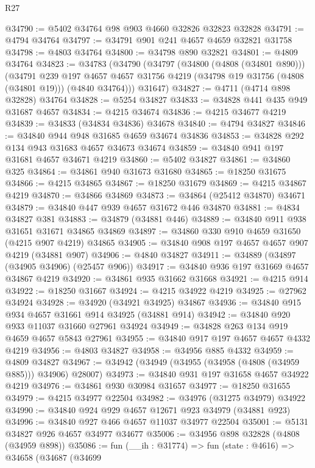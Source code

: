 \begin{lexlean}{R27}
\begin{coremodule}
@34790 := @5402 @34764 @98 @903 @4660 @32826 @32823 @32828
@34791 := @4794 @34764
@34797 := @34791 @901 @241 @4657 @4659 @32821 @31758
@34798 := @4803 @34764
@34800 := @34798 @890 @32821
@34801 := @4809 @34764
@34823 := @34783
    (@34790
      (@34797
        (@34800 (@4808 (@34801 @890)))
        (@34791
          @239
          @197
          @4657
          @4657
          @31756
          @4219
          (@34798 @19 @31756 (@4808 (@34801 @19)))
          (@4840 @34764)))
      @31647)
@34827 := @4711 (@4714 @898 @32828) @34764
@34828 := @5254 @34827
@34833 := @34828 @441 @435 @949 @31687 @4657
@34834 := @4215 @34674
@34836 := @4215 @34677 @4219
@34839 := @34833 (@34834 @34836) @34678
@34840 := @4794 @34827
@34846 := @34840 @944 @948 @31685 @4659 @34674 @34836
@34853 := @34828 @292 @134 @943 @31683 @4657 @34673 @34674
@34859 := @34840 @941 @197 @31681 @4657 @34671 @4219
@34860 := @5402 @34827
@34861 := @34860 @325
@34864 := @34861 @940 @31673 @31680
@34865 := @18250 @31675
@34866 := @4215 @34865
@34867 := @18250 @31679
@34869 := @4215 @34867 @4219
@34870 := @34866 @34869
@34873 := @34864 (@25412 @34870) @34671
@34879 := @34840 @447 @939 @4657 @31672 @446 @34870
@34881 := @4834 @34827 @381
@34883 := @34879 (@34881 @446)
@34889 := @34840 @911 @938 @31651 @31671 @34865 @34869
@34897 := @34860 @330 @910 @4659 @31650 (@4215 @907 @4219) @34865
@34905 := @34840 @908 @197 @4657 @4657 @907 @4219 (@34881 @907)
@34906 := @4840 @34827
@34911 := @34889 (@34897 (@34905 @34906) (@25457 @906))
@34917 := @34840 @936 @197 @31669 @4657 @34867 @4219
@34920 := @34861 @935 @31662 @31668
@34921 := @4215 @914
@34922 := @18250 @31667
@34924 := @4215 @34922 @4219
@34925 := @27962 @34924
@34928 := @34920 (@34921 @34925) @34867
@34936 := @34840 @915 @934 @4657 @31661 @914 @34925 (@34881 @914)
@34942 := @34840 @920 @933 @11037 @31660 @27961 @34924
@34949 := @34828 @263 @134 @919 @4659 @4657 @5843 @27961
@34955 := @34840 @917 @197 @4657 @4657 @4332 @4219
@34956 := @4803 @34827
@34958 := @34956 @885 @4332
@34959 := @4809 @34827
@34967 := @34942 (@34949 (@34955 (@34958 (@4808 (@34959 @885))) @34906) @28007)
@34973 := @34840 @931 @197 @31658 @4657 @34922 @4219
@34976 := @34861 @930 @30984 @31657
@34977 := @18250 @31655
@34979 := @4215 @34977 @22504
@34982 := @34976 (@31275 @34979) @34922
@34990 := @34840 @924 @929 @4657 @12671 @923 @34979 (@34881 @923)
@34996 := @34840 @927 @466 @4657 @11037 @34977 @22504
@35001 := @5131 @34827 @926 @4657 @34977 @34677
@35006 := @34956 @898 @32828 (@4808 (@34959 @898))
@35086 := fun (__ih : @31774) =>
  fun (state : @4616) =>
  @34658
    (@34687
      (@34699

\end{coremodule}
\end{lexlean}
